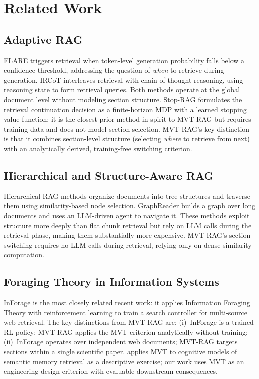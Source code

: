 \documentclass[11pt,letterpaper]{article}
\begin{document}
\section{Related Work}

\subsection{Adaptive RAG}

FLARE \citep{Jiang2023} triggers retrieval when token-level generation probability falls below a confidence threshold,
addressing the question of \emph{when} to retrieve during generation. IRCoT \citep{Trivedi2022} interleaves retrieval
with chain-of-thought reasoning, using reasoning state to form retrieval queries. Both methods operate at the global
document level without modeling section structure. Stop-RAG \citep{Park2025} formulates the retrieval continuation
decision as a finite-horizon MDP with a learned stopping value function; it is the closest prior method in spirit to
MVT-RAG but requires training data and does not model section selection. MVT-RAG's key distinction is that it combines
section-level structure (selecting \emph{where} to retrieve from next) with an analytically derived, training-free
switching criterion.

\subsection{Hierarchical and Structure-Aware RAG}

Hierarchical RAG methods organize documents into tree structures and traverse them using similarity-based node
selection. GraphReader \citep{Li2024} builds a graph over long documents and uses an LLM-driven agent to navigate it.
These methods exploit structure more deeply than flat chunk retrieval but rely on LLM calls during the retrieval phase,
making them substantially more expensive. MVT-RAG's section-switching requires no LLM calls during retrieval, relying
only on dense similarity computation.

\subsection{Foraging Theory in Information Systems}

InForage \citep{Qian2025} is the most closely related recent work: it applies Information Foraging Theory with
reinforcement learning to train a search controller for multi-source web retrieval. The key distinctions from MVT-RAG
are: (i)~InForage is a trained RL policy; MVT-RAG applies the MVT criterion analytically without training;
(ii)~InForage operates over independent web documents; MVT-RAG targets sections within a single scientific paper.
\citet{Moore2025} applies MVT to cognitive models of semantic memory retrieval as a descriptive exercise; our work
uses MVT as an engineering design criterion with evaluable downstream consequences.
\end{document}
